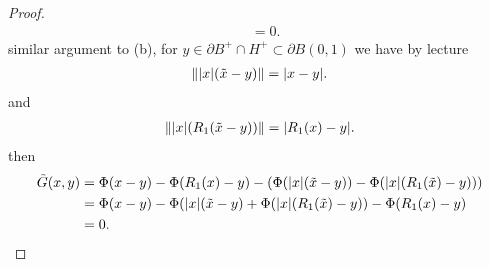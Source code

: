 \begin{proof}
\begin{align*}
                &= 0
.\end{align*}
similar argument to (b), for $y \in \partial B^{+} \cap H^{+} \subset  \partial B(0,1)$  we have by lecture 
\begin{align*}
  \|\lvert x\rvert(\tilde{x}-y )\| = \lvert x-y\rvert
.\end{align*}
and 
\begin{align*}
  \|\lvert x\rvert(R_1(\tilde{x} -y ))\| = \lvert R_1(x)-y\rvert
.\end{align*}
then
\begin{align*} 
 \tilde{G}(x,y) &=   \Phi(x-y) - \Phi(R_{1}(x)-y)  - (\Phi(\lvert x\rvert(\tilde{x} - y )) - \Phi(\lvert x\rvert(R_{1}(\tilde{x})-y)))\\
                &= \Phi(x-y) -  \Phi(\lvert x\rvert(\tilde{x} - y ) +   \Phi(\lvert x\rvert(R_{1}(\tilde{x})-y)) -\Phi(R_{1}(x)-y)\\
                &= 0
.\end{align*}
\end{proof}
